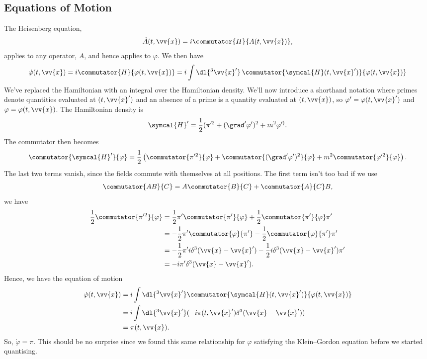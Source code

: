 \documentclass[fleqn]{NotesClass}
\newcommand{\hamiltonianDensity}{\symcal{H}}
\begin{document}
    \subsection{Equations of Motion}
    The Heisenberg equation,
    \begin{equation}
        \dot{A}(t, \vv{x}) = i \commutator{H}{A(t, \vv{x})},
    \end{equation}
    applies to any operator, \(A\), and hence applies to \(\varphi\).
    We then have
    \begin{equation}
        \dot{\varphi}(t, \vv{x}) = i \commutator{H}{\varphi(t, \vv{x})} = i \int \dl{^3\vv{x}'} \, \commutator{\hamiltonianDensity(t, \vv{x}')}{\varphi(t, \vv{x})}
    \end{equation}
    We've replaced the Hamiltonian with an integral over the Hamiltonian density.
    We'll now introduce a shorthand notation where primes denote quantities evaluated at \((t, \vv{x}')\) and an absence of a prime is a quantity evaluated at \((t, \vv{x})\), so \(\varphi' = \varphi(t, \vv{x}')\) and \(\varphi = \varphi(t, \vv{x})\).
    The Hamiltonian density is
    \begin{equation}
        \hamiltonianDensity' = \frac{1}{2}(\pi'^2 + (\grad'\varphi')^2 + m^2\varphi'^).
    \end{equation}
    The commutator then becomes
    \begin{equation}
        \commutator{\hamiltonianDensity'}{\varphi} = \frac{1}{2}\left( \commutator{\pi'^2}{\varphi} + \commutator{(\grad'\varphi')^2}{\varphi} + m^2\commutator{\varphi'^2}{\varphi} \right).
    \end{equation}
    The last two terms vanish, since the fields commute with themselves at all positions.
    The first term isn't too bad if we use
    \begin{equation}
        \commutator{AB}{C} = A \commutator{B}{C} + \commutator{A}{C}B,
    \end{equation}
    we have
    \begin{align}
        \frac{1}{2}\commutator{\pi'^2}{\varphi} &= \frac{1}{2}\pi'\commutator{\pi'}{\varphi} + \frac{1}{2}\commutator{\pi'}{\varphi}\pi'\\
        &= -\frac{1}{2}\pi'\commutator{\varphi}{\pi'} - \frac{1}{2}\commutator{\varphi}{\pi'}\pi'\\
        &= -\frac{1}{2} \pi' i\delta^3(\vv{x} - \vv{x}') - \frac{1}{2} i\delta^3(\vv{x} - \vv{x}') \pi'\\
        &= -i\pi' \delta^3(\vv{x} - \vv{x}').
    \end{align}
    Hence, we have the equation of motion
    \begin{align}
        \dot{\varphi}(t, \vv{x}) &= i \int \dl{^3\vv{x}'} \commutator{\hamiltonianDensity(t, \vv{x}')}{\varphi(t, \vv{x})}\\
        &= i \int \dl{^3\vv{x}'} (-i\pi(t, \vv{x}') \delta^3(\vv{x} - \vv{x}'))\\
        &= \pi(t, \vv{x}).
    \end{align}
    So, \(\dot{\varphi} = \pi\).
    This should be no surprise since we found this same relationship for \(\varphi\) satisfying the Klein--Gordon equation before we started quantising.
    
\end{document}
